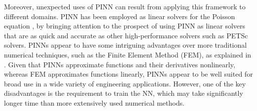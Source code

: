 \documentclass[pdflatex,sn-basic]{sn-jnl}%
\theoremstyle{thmstyleone}%
\theoremstyle{thmstyletwo}%
\theoremstyle{thmstylethree}%
\begin{document}
Moreover, unexpected uses of PINN can result from applying this framework to different domains.
PINN has been employed as linear solvers for the Poisson equation \cite{Mar2021_OldNewCan_Mar}, by bringing attention to the prospect of using PINN as linear solvers that are as quick and accurate as other high-performance solvers such as PETSc solvers. 
%
PINNs appear to have some intriguing advantages over more traditional numerical techniques, such as the Finite Element Method (FEM), as explained in \cite{lu2021deepxde}.
Given that PINNs approximate functions and their derivatives nonlinearly, whereas FEM approximates functions linearly, PINNs appear to be well suited for broad use in a wide variety of engineering applications.
However, one of the key disadvantages is the requirement to train the NN, which may take significantly longer time than more extensively used numerical methods.
\end{document}
